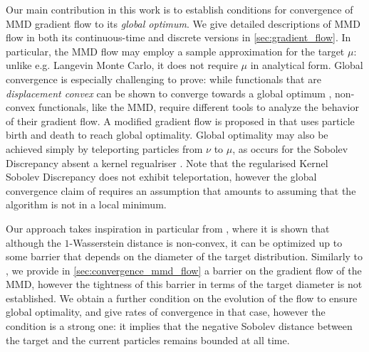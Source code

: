  



Our main contribution in this work is to establish conditions for convergence of MMD gradient flow to its {\em global optimum}.
We give detailed descriptions of  MMD flow in both its continuous-time and discrete versions in \cref{sec:gradient_flow}.
In particular, the MMD flow may employ a sample approximation for the target $\mu$: unlike e.g. Langevin Monte Carlo,
it does not require  $\mu$ in analytical form.
Global convergence is especially challenging to prove: while functionals  that are \textit{displacement convex} can be shown to converge towards a global optimum \cite{ambrosio2008gradient}, non-convex functionals, like the MMD,  require different tools to analyze the behavior of their gradient flow.
 A modified gradient flow is proposed in \cite{rotskoff2019global} that uses particle birth and death to reach global optimality.
Global optimality may also be achieved simply by teleporting particles from $\nu$ to $\mu$, as occurs for the Sobolev Discrepancy absent a kernel regualriser \cite[Theorem 4, Appendix D]{Mroueh:2019}.
Note that the regularised Kernel Sobolev Discrepancy does not exhibit teleportation, however the global convergence claim of \cite[Proposition 3, Appendix B.1]{Mroueh:2019} requires an assumption \cite[Assumption A]{Mroueh:2019} that amounts to assuming that the algorithm is not in a local minimum.


Our approach takes  inspiration in particular from \cite{Bottou:2017}, where it is shown that although the $1$-Wasserstein distance is non-convex, it can be optimized up to some barrier that depends on the diameter of the target distribution.
Similarly to \cite{Bottou:2017}, we provide in \cref{sec:convergence_mmd_flow} a barrier on the gradient flow of the MMD, however
the tightness of this barrier in terms of the target diameter is not established.
We  obtain a further condition on the evolution of the flow to ensure global optimality, and give rates of convergence in that case, however
the condition is a strong one: it implies that the negative Sobolev distance between the target and the current particles remains bounded at all time.

